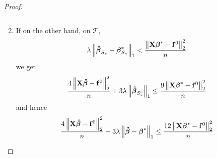\begin{proof}
\begin{enumerate}
\[              \]
        \item If on the other hand, on $\mathscr{T}$,
              \[
                  \lambda\left\|\boldsymbol{\hat{\beta}}_{S_{*}}-\boldsymbol{\beta}_{S_{*}}^{*}\right\|_{1} < \frac{\left\|\mathbf{X} \boldsymbol{\beta}^{*}-\mathbf{f}^{0}\right\|_{2}^{2}}{n}
              \]
              we get
              \[
                \frac{4\left\|\mathbf{X} \boldsymbol{\hat{\beta}}-\mathbf{f}^{0}\right\|_{2}^{2}}{n} + 3 \lambda\left\|\boldsymbol{\hat{\beta}}_{S_{*}^{c}}\right\|_{1} \leq \frac{9\left\|\mathbf{X} \boldsymbol{\beta}^{*}-\mathbf{f}^{0}\right\|_{2}^{2}}{n}
              \]
              and hence
              \[
                \frac{4\left\|\mathbf{X} \boldsymbol{\hat{\beta}}-\mathbf{f}^{0}\right\|_{2}^{2}}{n} + 3 \lambda\left\|\boldsymbol{\hat{\beta}}-\boldsymbol{\beta}^{*}\right\|_{1} \leq \frac{12\left\|\mathbf{X} \boldsymbol{\beta}^{*}-\mathbf{f}^{0}\right\|_{2}^{2}}{n}
              \]
    \end{enumerate}
\end{proof}

